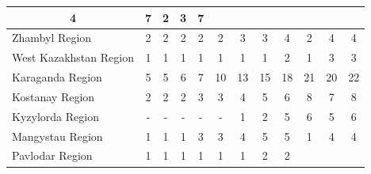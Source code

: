 \begin{table}[H]
{\begin{tabular}{|lccccccccccc|}
  \multicolumn{1}{c|}{4} &
  \multicolumn{1}{c|}{7} &
  \multicolumn{1}{c|}{2} &
  \multicolumn{1}{c|}{3} &
  7 \\ \hline
\multicolumn{1}{|l|}{Zhambyl Region} &
  \multicolumn{1}{c|}{2} &
  \multicolumn{1}{c|}{2} &
  \multicolumn{1}{c|}{2} &
  \multicolumn{1}{c|}{2} &
  \multicolumn{1}{c|}{2} &
  \multicolumn{1}{c|}{3} &
  \multicolumn{1}{c|}{3} &
  \multicolumn{1}{c|}{4} &
  \multicolumn{1}{c|}{2} &
  \multicolumn{1}{c|}{4} &
  4 \\ \hline
\multicolumn{1}{|l|}{West Kazakhstan Region} &
  \multicolumn{1}{c|}{1} &
  \multicolumn{1}{c|}{1} &
  \multicolumn{1}{c|}{1} &
  \multicolumn{1}{c|}{1} &
  \multicolumn{1}{c|}{1} &
  \multicolumn{1}{c|}{1} &
  \multicolumn{1}{c|}{1} &
  \multicolumn{1}{c|}{2} &
  \multicolumn{1}{c|}{1} &
  \multicolumn{1}{c|}{3} &
  3 \\ \hline
\multicolumn{1}{|l|}{Karaganda Region} &
  \multicolumn{1}{c|}{5} &
  \multicolumn{1}{c|}{5} &
  \multicolumn{1}{c|}{6} &
  \multicolumn{1}{c|}{7} &
  \multicolumn{1}{c|}{10} &
  \multicolumn{1}{c|}{13} &
  \multicolumn{1}{c|}{15} &
  \multicolumn{1}{c|}{18} &
  \multicolumn{1}{c|}{21} &
  \multicolumn{1}{c|}{20} &
  22 \\ \hline
\multicolumn{1}{|l|}{Kostanay Region} &
  \multicolumn{1}{c|}{2} &
  \multicolumn{1}{c|}{2} &
  \multicolumn{1}{c|}{2} &
  \multicolumn{1}{c|}{3} &
  \multicolumn{1}{c|}{3} &
  \multicolumn{1}{c|}{4} &
  \multicolumn{1}{c|}{5} &
  \multicolumn{1}{c|}{6} &
  \multicolumn{1}{c|}{8} &
  \multicolumn{1}{c|}{7} &
  8 \\ \hline
\multicolumn{1}{|l|}{Kyzylorda Region} &
  \multicolumn{1}{c|}{-} &
  \multicolumn{1}{c|}{-} &
  \multicolumn{1}{c|}{-} &
  \multicolumn{1}{c|}{-} &
  \multicolumn{1}{c|}{-} &
  \multicolumn{1}{c|}{1} &
  \multicolumn{1}{c|}{2} &
  \multicolumn{1}{c|}{5} &
  \multicolumn{1}{c|}{6} &
  \multicolumn{1}{c|}{5} &
  6 \\ \hline
\multicolumn{1}{|l|}{Mangystau Region} &
  \multicolumn{1}{c|}{1} &
  \multicolumn{1}{c|}{1} &
  \multicolumn{1}{c|}{1} &
  \multicolumn{1}{c|}{3} &
  \multicolumn{1}{c|}{3} &
  \multicolumn{1}{c|}{4} &
  \multicolumn{1}{c|}{5} &
  \multicolumn{1}{c|}{5} &
  \multicolumn{1}{c|}{1} &
  \multicolumn{1}{c|}{4} &
  4 \\ \hline
\multicolumn{1}{|l|}{Pavlodar Region} &
  \multicolumn{1}{c|}{1} &
  \multicolumn{1}{c|}{1} &
  \multicolumn{1}{c|}{1} &
  \multicolumn{1}{c|}{1} &
  \multicolumn{1}{c|}{1} &
  \multicolumn{1}{c|}{1} &
  \multicolumn{1}{c|}{2} &
  \multicolumn{1}{c|}{2} &

\end{tabular}}
\end{table}
